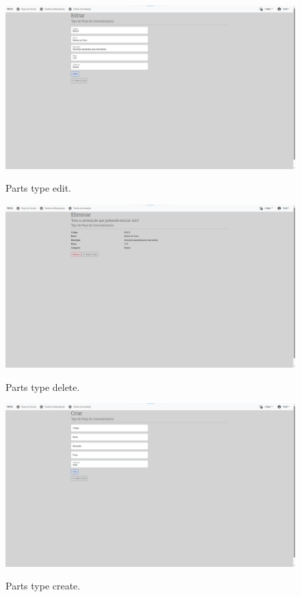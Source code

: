 \begin{figure}[h]
  \caption{Parts type edit.}
  \centering
  \includegraphics[width=\textwidth]{figs/Implementation/dealershipAdmin/partsEdit}
  \label{fig:partsEdit}
\end{figure}

\begin{figure}[h]
  \caption{Parts type delete.}
  \centering
  \includegraphics[width=\textwidth]{figs/Implementation/dealershipAdmin/partsDelete}
  \label{fig:partsDelete}
\end{figure}


\begin{figure}[h]
  \caption{Parts type create.}
  \centering
  \includegraphics[width=\textwidth]{figs/Implementation/dealershipAdmin/partsCreate}
  \label{fig:partsCreate}
\end{figure}



